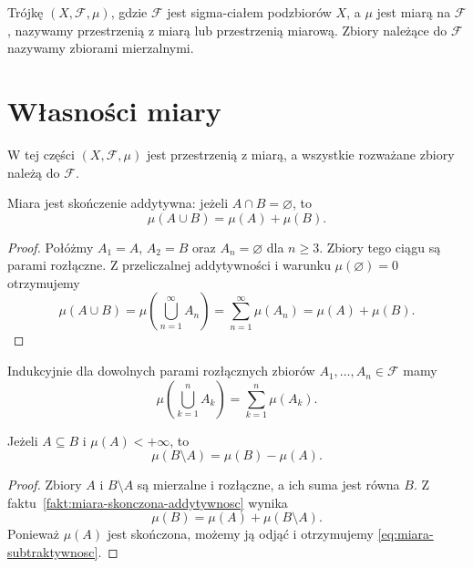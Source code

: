 \begin{definicja}
Trójkę $(X,\mathcal{F},\mu)$, gdzie $\mathcal{F}$ jest sigma-ciałem
podzbiorów $X$, a $\mu$ jest miarą na $\mathcal{F}$,
nazywamy przestrzenią z miarą lub przestrzenią miarową.
Zbiory należące do $\mathcal{F}$ nazywamy zbiorami mierzalnymi.
\end{definicja}

\section{Własności miary}
\label{sec:wlasnosci-miary}

W tej części $(X,\mathcal{F},\mu)$ jest przestrzenią z miarą,
a wszystkie rozważane zbiory należą do $\mathcal{F}$.

\begin{fakt}
\label{fakt:miara-skonczona-addytywnosc}
Miara jest skończenie addytywna: jeżeli $A\cap B=\varnothing$, to
\[
  \mu(A\cup B)=\mu(A)+\mu(B).
\]
\end{fakt}

\begin{proof}
Połóżmy $A_1=A$, $A_2=B$ oraz $A_n=\varnothing$ dla $n\geq3$.
Zbiory tego ciągu są parami rozłączne. Z przeliczalnej addytywności
i warunku $\mu(\varnothing)=0$ otrzymujemy
\[
  \mu(A\cup B)
  =\mu\left(\bigcup_{n=1}^{\infty}A_n\right)
  =\sum_{n=1}^{\infty}\mu(A_n)=\mu(A)+\mu(B).
\]
\end{proof}

\begin{uwaga}
Indukcyjnie dla dowolnych parami rozłącznych zbiorów
$A_1,\ldots,A_n\in\mathcal{F}$ mamy
\[
  \mu\left(\bigcup_{k=1}^{n}A_k\right)=\sum_{k=1}^{n}\mu(A_k).
\]
\end{uwaga}

\begin{fakt}[Subtraktywność]
\label{fakt:miara-subtraktywnosc}
Jeżeli $A\subseteq B$ i $\mu(A)<+\infty$, to
\begin{equation}
  \mu(B\setminus A)=\mu(B)-\mu(A).
  \label{eq:miara-subtraktywnosc}
\end{equation}
\end{fakt}

\begin{proof}
Zbiory $A$ i $B\setminus A$ są mierzalne i rozłączne, a ich suma
jest równa $B$. Z faktu~\ref{fakt:miara-skonczona-addytywnosc} wynika
\begin{equation}
  \mu(B)=\mu(A)+\mu(B\setminus A).
  \label{eq:miara-rozklad-roznicy}
\end{equation}
Ponieważ $\mu(A)$ jest skończona, możemy ją odjąć i otrzymujemy
\eqref{eq:miara-subtraktywnosc}.
\end{proof}


